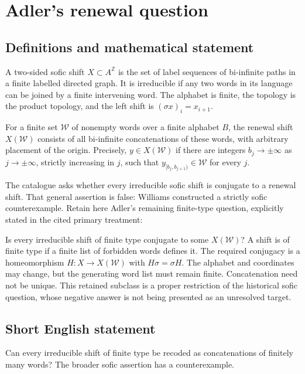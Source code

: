 \documentclass[11pt,a4paper]{article}
\begin{document}
\section*{Adler's renewal question}\label{statement}

\subsection{Definitions and mathematical statement}
A two-sided sofic shift $X\subset A^{\mathbb Z}$ is the set of
label sequences of bi-infinite paths in a finite labelled
directed graph. It is irreducible if any two words in its
language can be joined by a finite intervening word.
The alphabet is finite, the topology is the product topology,
and the left shift is $(\sigma x)_i=x_{i+1}$.

For a finite set $\mathcal W$ of nonempty words over a finite
alphabet $B$, the renewal shift $X(\mathcal W)$ consists of
all bi-infinite concatenations of these words, with arbitrary
placement of the origin. Precisely, $y\in X(\mathcal W)$ if
there are integers $b_j\to\pm\infty$ as $j\to\pm\infty$,
strictly increasing in $j$, such that
$y_{[b_j,b_{j+1})}\in\mathcal W$ for every $j$.

The catalogue asks whether every irreducible sofic shift is
conjugate to a renewal shift. That general assertion is false:
Williams constructed a strictly sofic counterexample. Retain
here Adler's remaining finite-type question, explicitly stated
in the cited primary treatment:

Is every irreducible shift of finite type conjugate to some
$X(\mathcal W)$? A shift is of finite type if a finite list
of forbidden words defines it. The required conjugacy is a
homeomorphism $H:X\to X(\mathcal W)$ with $H\sigma=\sigma H$.
The alphabet and coordinates may change, but the generating
word list must remain finite. Concatenation need not be unique.
This retained subclass is a proper restriction of the
historical sofic question, whose negative answer is not being
presented as an unresolved target.
\subsection{Short English statement}
Can every irreducible shift of finite type be recoded as concatenations of finitely many words? The broader sofic assertion has a counterexample.
\end{document}
